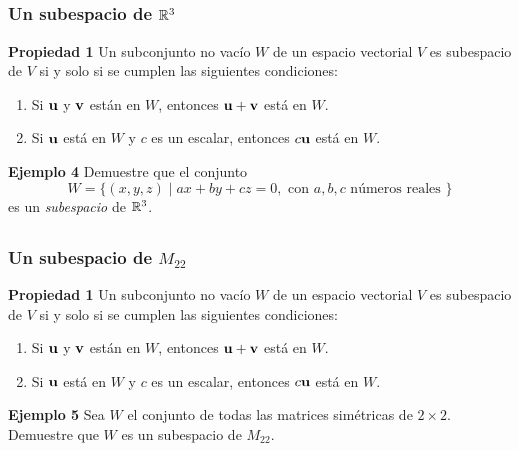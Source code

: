 
\subsection{}

\begin{frame}\frametitle{Un subespacio de $\mathbb{R}^3$}

\begin{prop}{\textbf{Propiedad 1}}
	\justifying
	Un subconjunto no vacío $W$ de un espacio vectorial $V$ es {\color{red} subespacio} 
	de $V$ si y solo si se cumplen las siguientes condiciones:
	\begin{enumerate}
		\item[\labelname{$a$}] Si $\mathbf{u}$ y $\mathbf{v}$ están en $W$, entonces $\mathbf{u}+\mathbf{v}$ está en $W$.
		\item[\labelname{$b$}] Si $\mathbf{u}$ está en $W$ y $c$ es un escalar, entonces $c\mathbf{u}$ está en $W$.
	\end{enumerate}
\end{prop}

\begin{ej}{\textbf{Ejemplo 4}}\justifying
	Demuestre que el conjunto 
	\[
	W = \{ (x,y,z) \mid ax+by+cz = 0, \text{ con } a, b, c \text{ números reales } \}
	\]
	es un \textit{subespacio} de $\mathbb{R}^3$.
\end{ej}

\end{frame}


\subsection{}

\begin{frame}\frametitle{Un subespacio de $M_{22}$}

\begin{prop}{\textbf{Propiedad 1}}
	\justifying
	Un subconjunto no vacío $W$ de un espacio vectorial $V$ es {\color{red} subespacio} 
	de $V$ si y solo si se cumplen las siguientes condiciones:
	\begin{enumerate}
		\item[\labelname{$a$}] Si $\mathbf{u}$ y $\mathbf{v}$ están en $W$, entonces $\mathbf{u}+\mathbf{v}$ está en $W$.
		\item[\labelname{$b$}] Si $\mathbf{u}$ está en $W$ y $c$ es un escalar, entonces $c\mathbf{u}$ está en $W$.
	\end{enumerate}
\end{prop}

\begin{ej}{\textbf{Ejemplo 5}}\justifying
	Sea $W$ el conjunto de todas las matrices simétricas de $2\times 2$. Demuestre que $W$  es
	un subespacio de $M_{22}$.
\end{ej}

\end{frame}

